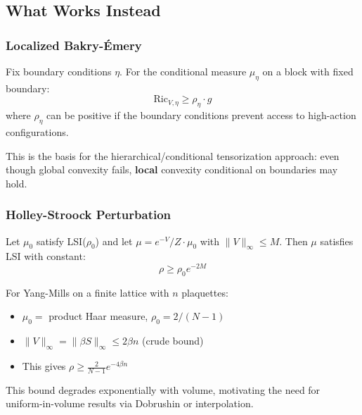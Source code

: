 \subsection{What Works Instead}

\subsubsection{Localized Bakry-\'Emery}

\begin{theorem}\label{thm:conditional-be}
Fix boundary conditions $\eta$. For the conditional measure $\mu_\eta$ on a block with fixed boundary:
\begin{equation}
    \mathrm{Ric}_{V,\eta} \geq \rho_\eta \cdot g
\end{equation}
where $\rho_\eta$ can be positive if the boundary conditions prevent access to high-action configurations.
\end{theorem}

This is the basis for the hierarchical/conditional tensorization approach: even though global convexity fails, \textbf{local} convexity conditional on boundaries may hold.

\subsubsection{Holley-Stroock Perturbation}

\begin{theorem}\label{thm:holley-stroock-be}
Let $\mu_0$ satisfy LSI($\rho_0$) and let $\mu = e^{-V}/Z \cdot \mu_0$ with $\|V\|_\infty \leq M$. Then $\mu$ satisfies LSI with constant:
\begin{equation}
    \rho \geq \rho_0 e^{-2M}
\end{equation}
\end{theorem}

For Yang-Mills on a finite lattice with $n$ plaquettes:
\begin{itemize}
    \item $\mu_0 = $ product Haar measure, $\rho_0 = 2/(N-1)$
    \item $\|V\|_\infty = \|\beta S\|_\infty \leq 2\beta n$ (crude bound)
    \item This gives $\rho \geq \frac{2}{N-1} e^{-4\beta n}$
\end{itemize}

This bound degrades exponentially with volume, motivating the need for uniform-in-volume results via Dobrushin or interpolation.

